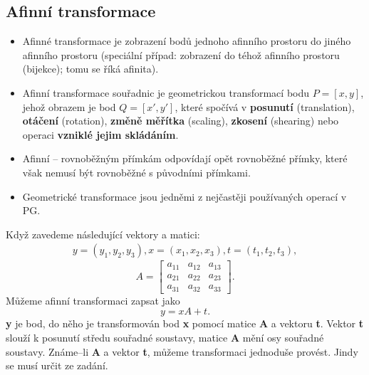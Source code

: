 \subsection{Afinní transformace}
\begin{itemize}
	\item Afinné transformace je zobrazení bodů jednoho afinního prostoru do jiného afinního prostoru (speciální případ: zobrazení do téhož afinního prostoru (bijekce); tomu se říká afinita).
	\item Afinní transformace souřadnic je geometrickou transformací bodu $P=[x,y]$, jehož obrazem je bod $Q=[x',y']$, které spočívá v \textbf{posunutí} (translation), \textbf{otáčení} (rotation), \textbf{změně měřítka} (scaling), \textbf{zkosení} (shearing) nebo operaci \textbf{vzniklé jejim skládáním}.
	\item Afinní -- rovnoběžným přímkám odpovídají opět rovnoběžné přímky, které však nemusí být rovnoběžné s původními přímkami.
	\item Geometrické transformace jsou jedněmi z nejčastěji používaných operací v PG.
\end{itemize}
Když zavedeme následující vektory a matici:
\begin{equation*}
\begin{aligned}
 y = (y_1,y_2,y_3),  x = (x_1,x_2,x_3), t = (t_1,t_2,t_3),
 \end{aligned}
\end{equation*}
\begin{equation*}
 A = \begin{bmatrix}
     a_{11} & a_{12}  & a_{13}      \\[0.3em]
     a_{21} & a_{22}  & a_{23}      \\[0.3em]
     a_{31} & a_{32}  & a_{33} 
     \end{bmatrix}.
\end{equation*}
Můžeme afinní transformaci zapsat jako
\begin{equation*}
 y = xA + t.
\end{equation*}
\textbf{y} je bod, do něho je transformován bod \textbf{x} pomocí matice \textbf{A} a vektoru \textbf{t}. Vektor \textbf{t} slouží k posunutí středu souřadné soustavy, matice \textbf{A} mění osy souřadné soustavy. Známe--li \textbf{A} a vektor \textbf{t}, můžeme transformaci jednoduše provést. Jindy se musí určit ze zadání.

